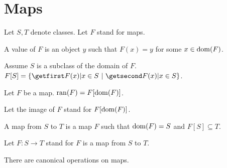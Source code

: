\documentclass{article}
\begin{document}
\section{Maps}
%
\begin{forthel}

Let $S, T$ denote classes.
Let $F$ stand for maps.

\begin{definition}
A value of $F$ is an object $y$ such
that $F(x) = y$ for some $x \in \operatorname{dom}(F)$.
\end{definition}


  \begin{definition}
    Assume $S$ is a subclass of the domain of $F$.
    $F[S] = \class{F(x) | x \in S}$.
  \end{definition}

\begin{definition}
Let $F$ be a map. $\operatorname{ran}(F) = F[\operatorname{dom}(F)]$.
\end{definition}


  Let the image of $F$ stand for $F[\operatorname{dom}(F)]$.

\begin{definition}
    A map from $S$ to $T$ is a map $F$ such that $\operatorname{dom}(F) = S$
and $F[S]  \subseteq T$.
  \end{definition}

Let $F : S \rightarrow T$ stand for $F$ is a map from $S$ to $T$.
%
\end{forthel}
%
There are canonical operations on maps.
%
\end{document}
